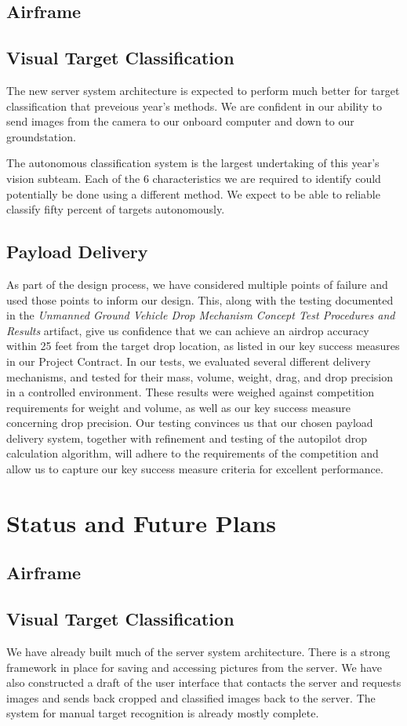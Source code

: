 \documentclass[]{auvsi_doc}
\begin{document}
\subsection{Airframe}
\subsection{Visual Target Classification}
The new server system architecture is expected to perform much better for target classification that preveious year's methods. We are
confident in our ability to send images from the camera to our onboard computer and down to our groundstation.

The autonomous classification system is the largest undertaking of this year's vision subteam. Each of the 6 characteristics we are
required to identify could potentially be done using a different method. We expect to be able to reliable classify fifty percent of
targets autonomously.
\subsection{Payload Delivery}
As part of the design process, we have considered multiple points of failure and used those points to inform our design. This, along with the testing documented in the \textit{Unmanned Ground Vehicle Drop Mechanism Concept Test Procedures and Results} artifact, give us confidence that we can achieve an airdrop accuracy within 25 feet from the target drop location, as listed in our key success measures in our Project Contract. In our tests, we evaluated several different delivery mechanisms, and tested for their mass, volume, weight, drag, and drop precision in a controlled environment. These results were weighed against competition requirements for weight and volume, as well as our key success measure concerning drop precision. Our testing convinces us that our chosen payload delivery system, together with refinement and testing of the autopilot drop calculation algorithm, will adhere to the requirements of the competition and allow us to capture our key success measure criteria for excellent performance.
\section{Status and Future Plans}
\subsection{Airframe}
\subsection{Visual Target Classification}
We have already built much of the server system architecture. There is a strong framework in place for saving and accessing pictures
from the server. We have also constructed a draft of the user interface that contacts the server and requests images and sends back
cropped and classified images back to the server. The system for manual target recognition is already mostly complete.
\end{document}
